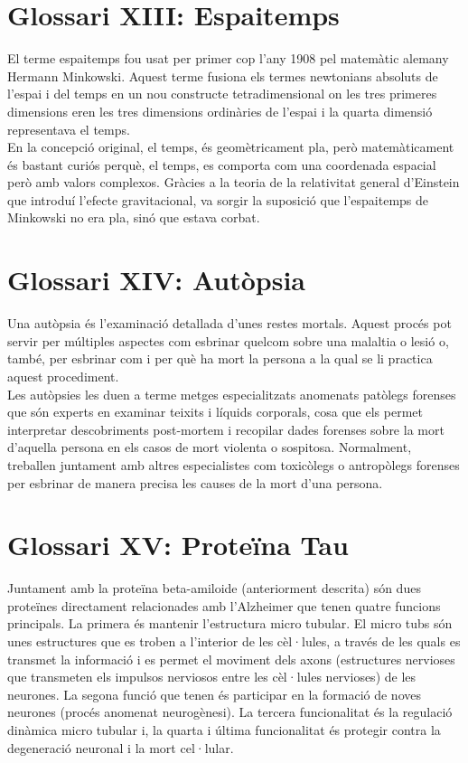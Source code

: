 \documentclass[a4paper,12pt]{report}
\begin{document}
\section*{Glossari XIII: Espaitemps}
El terme espaitemps fou usat per primer cop l'any 1908 pel matemàtic alemany Hermann Minkowski. Aquest terme fusiona els termes newtonians absoluts de l'espai i del temps en un nou constructe tetradimensional on les tres primeres dimensions eren les tres dimensions ordinàries de l'espai i la quarta dimensió representava el temps.\\
En la concepció original, el temps, és geomètricament pla, però matemàticament és bastant curiós perquè, el temps, es comporta com una coordenada espacial però amb valors complexos. Gràcies a la teoria de la relativitat general d'Einstein que introduí l'efecte gravitacional, va sorgir la suposició que l'espaitemps de Minkowski no era pla, sinó que estava corbat.
\section*{Glossari XIV: Autòpsia}
Una autòpsia és l'examinació detallada d'unes restes mortals. Aquest procés pot servir per múltiples aspectes com esbrinar quelcom sobre una malaltia o lesió o, també, per esbrinar com i per què ha mort la persona a la qual se li practica aquest procediment.\\
Les autòpsies les duen a terme metges especialitzats anomenats patòlegs forenses que són experts en examinar teixits i líquids corporals, cosa que els permet interpretar descobriments post-mortem i recopilar dades forenses sobre la mort d'aquella persona en els casos de mort violenta o sospitosa. Normalment, treballen juntament amb altres especialistes com toxicòlegs o antropòlegs forenses per esbrinar de manera precisa les causes de la mort d'una persona.
\section*{Glossari XV: Proteïna Tau}
Juntament amb la proteïna beta-amiloide (anteriorment descrita) són dues proteïnes directament relacionades amb l'Alzheimer que tenen quatre funcions principals. La primera és mantenir l'estructura micro tubular. El micro tubs són unes estructures que es troben a l'interior de les cèl·lules, a través de les quals es transmet la informació i es permet el moviment dels axons (estructures nervioses que transmeten els impulsos nerviosos entre les cèl·lules nervioses) de les neurones. La segona funció que tenen és participar en la formació de noves neurones (procés anomenat neurogènesi). La tercera funcionalitat és la regulació dinàmica micro tubular i, la quarta i última funcionalitat és protegir contra la degeneració neuronal i la mort cel·lular.
\end{document}
